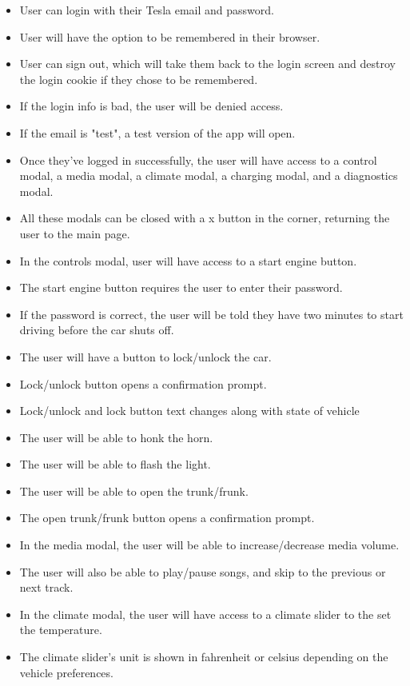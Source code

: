 \documentclass[onecolumn, draftclsnofoot,10pt, compsoc]{IEEEtran}
\begin{document}
\begin{itemize}
    \item User can login with their Tesla email and password.
    \item User will have the option to be remembered in their browser.
    \item User can sign out, which will take them back to the login screen and destroy the login cookie if they chose to be remembered.
    \item If the login info is bad, the user will be denied access.
    \item If the email is "test", a test version of the app will open.
    \item Once they've logged in successfully, the user will have access to a control modal, a media modal, a climate modal, a charging modal, and a diagnostics modal.
    \item All these modals can be closed with a x button in the corner, returning the user to the main page.
    \item In the controls modal, user will have access to a start engine button.
    \item The start engine button requires the user to enter their password.
    \item If the password is correct, the user will be told they have two minutes to start driving before the car shuts off.
    \item The user will have a button to lock/unlock the car.
    \item Lock/unlock button opens a confirmation prompt.
    \item Lock/unlock and lock button text changes along with state of vehicle
    \item The user will be able to honk the horn.
    \item The user will be able to flash the light.
    \item The user will be able to open the trunk/frunk.
    \item The open trunk/frunk button opens a confirmation prompt.
    \item In the media modal, the user will be able to increase/decrease media volume.
    \item The user will also be able to play/pause songs, and skip to the previous or next track.
    \item In the climate modal, the user will have access to a climate slider to the set the temperature.
    \item The climate slider's unit is shown in fahrenheit or celsius depending on the vehicle preferences.

\end{itemize}
\end{document}
